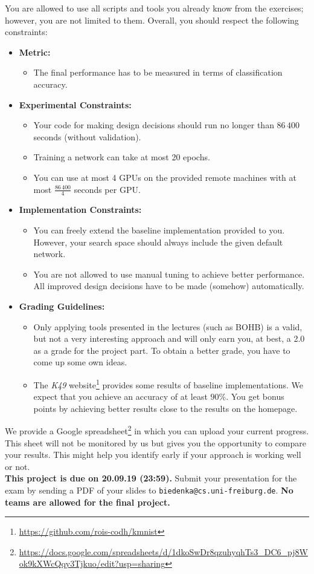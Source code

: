 \documentclass[10pt,a4paper]{article}
\newcommand{\duedate}{20.09.19 (23:59)}
\newcommand{\due}{{\bf This project is due on \duedate.} }
\begin{document}
		\noindent		
		You are allowed to use all scripts and tools you already know from the exercises; however, you are not limited to them.
		Overall, you should respect the following constraints:
		\begin{itemize}
			\item \textbf{Metric:}
			\begin{itemize}
				\item The final performance has to be measured in terms of classification accuracy.\\
			\end{itemize}
			\item \textbf{Experimental Constraints:}
			\begin{itemize}
				\item Your code for making design decisions should run no longer than $86\,400$ seconds (without validation).
				\item Training a network can take at most 20 epochs.
				\item You can use at most 4 GPUs on the provided remote machines with at most $\frac{86\,400}{4}$ seconds per GPU.
			\end{itemize}
			\item \textbf{Implementation Constraints:}
			\begin{itemize}
			  \item You can freely extend the baseline implementation provided to you. However, your search space should always include the given default network.
			  \item You are not allowed to use manual tuning to achieve better performance. All improved design decisions have to be made (somehow) automatically.
			\end{itemize}
			\item \textbf{Grading Guidelines:}
			\begin{itemize}
			  \item Only applying tools presented in the lectures (such as BOHB) is a valid, but not a very interesting approach and will only earn you, at best, a 2.0 as a grade for the project part. To obtain a better grade, you have to come up some own ideas.
			  \item The \textit{K49} website\footnote{\url{https://github.com/rois-codh/kmnist}} provides some results of baseline implementations. We expect that you achieve an accuracy of at least $90\%$. You get bonus points by achieving better results close to the results on the homepage.
			\end{itemize}
		\end{itemize}
		
		We provide a Google spreadsheet\footnote{\url{https://docs.google.com/spreadsheets/d/1dkoSwDr8qzuhyqhTs3_DC6_pj8Wok9kXWcQqy3Tjkuo/edit?usp=sharing}} in which you can upload your current progress. This sheet will not be monitored by us but gives you the opportunity to compare your results. This might help you identify early if your approach is working well or not.
\vspace*{\fill}\\
\noindent
\due Submit your presentation for the exam by sending a PDF of your slides to \texttt{biedenka@cs.uni-freiburg.de}. \textbf{No teams are allowed for the final project.}
\end{document}
